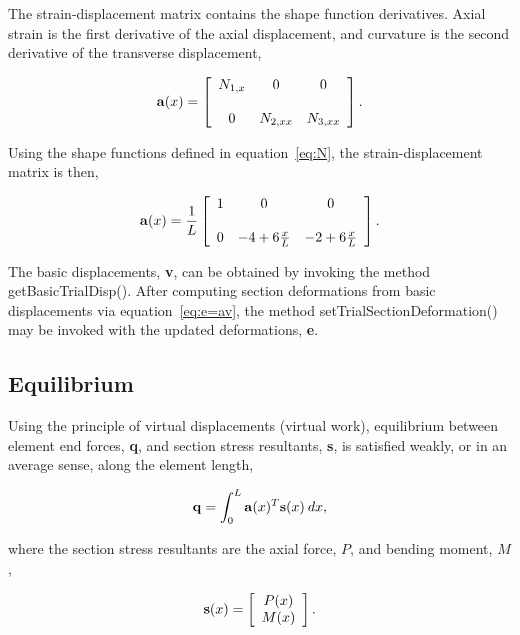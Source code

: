 \documentclass[12pt]{article}
\begin{document}
\noindent The strain-displacement matrix contains the shape function derivatives.
Axial strain is the first derivative of the axial displacement, and
curvature is the second derivative of the transverse displacement,

\begin{equation}
{\bf a}(x) = \left[ \begin{array}{ccc}
N_{1,x} & 0 & 0 \\ \\
0 & N_{2,xx} & N_{3,xx}
\end{array}
\right].
\end{equation}

\noindent Using the shape functions defined in equation~\ref{eq:N}, the
strain-displacement matrix is then,

\begin{equation}
{\bf a}(x) = \frac{1}{L} \left[ \begin{array}{ccc}
1 & 0 & 0 \\ \\
0 & -4+6\frac{x}{L} & -2+6\frac{x}{L}
\end{array}
\right].
\end{equation}

\noindent The basic displacements, {\bf v}, can be obtained by invoking
the method getBasicTrialDisp().
After computing section deformations from basic displacements via
equation~\ref{eq:e=av}, the
method setTrialSectionDeformation() may be invoked with the updated
deformations, {\bf e}.

\subsection{Equilibrium}
Using the principle of virtual displacements (virtual work),
equilibrium between element end forces, {\bf q}, and section stress
resultants, {\bf s},
is satisfied weakly, or in an average sense, along the element length,

\begin{equation}
\label{eq:q}
{\bf q} = \int_0^L {\bf a}(x)^T {\bf s}(x) \: dx,
\end{equation}

\noindent where the section stress resultants are the axial force, $P$, and bending
moment, $M$,

\begin{equation}
{\bf s}(x) =
\left[ \begin{array}{c} P(x) \\ M(x) \end{array} \right].
\end{equation}
\end{document}

